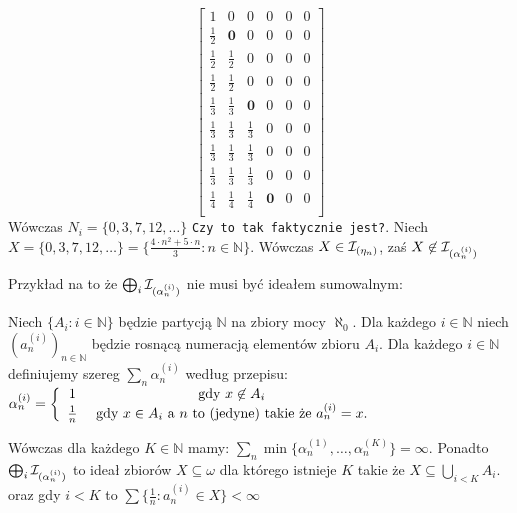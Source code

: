 \documentclass[12pt]{article}
\theoremstyle{plain}
\theoremstyle{definition}
\theoremstyle{remark}
\newcommand{\nnatural}{\mathbb{N}}
\newcommand{\cI}{{\cal I}}
\newcommand{\todo}[1]{{\tt #1}}
\begin{document}
\[
  \begin{bmatrix}
         1      &           0 & 0 & 0 & 0 & 0\\
    \frac{1}{2} &  \mathbf{0} & 0 & 0 & 0 & 0\\
    \frac{1}{2} & \frac{1}{2} & 0 & 0 & 0 & 0\\
    \frac{1}{2} & \frac{1}{2} & 0 & 0 & 0 & 0\\
    \frac{1}{3} & \frac{1}{3} & \mathbf{0} & 0 & 0 & 0\\
    \frac{1}{3} & \frac{1}{3} & \frac{1}{3} & 0 & 0 & 0\\
    \frac{1}{3} & \frac{1}{3} & \frac{1}{3} & 0 & 0 & 0\\
    \frac{1}{3} & \frac{1}{3} & \frac{1}{3} & 0 & 0 & 0\\
    \frac{1}{4} & \frac{1}{4} & \frac{1}{4} & \mathbf{0} & 0 & 0\\
  \end{bmatrix}
\]
Wówczas $N_i = \{0, 3, 7, 12, \ldots \}$ \todo{Czy to tak faktycznie jest?}.
Niech $X = \{0, 3, 7, 12, \ldots\} = \{ \frac{4 \cdot n^2 + 5 \cdot n}{3} \colon n \in\nnatural \}$.
Wówczas $X \in \cI_{(\eta_n)}$, zaś $X\not\in\cI_{(\alpha_n^{(i)})}$

Przykład na to że $\bigoplus_{i}\cI_{(\alpha_n^{(i)})}$ nie musi być
ideałem sumowalnym:
	
Niech $\{A_i\colon i\in\nnatural\}$ będzie partycją $\nnatural$
na zbiory mocy $\aleph_0$. Dla każdego $i\in\nnatural$ niech
$(a_n^{(i)})_{n\in\nnatural}$ będzie rosnącą numeracją
elementów zbioru $A_i$.
Dla każdego $i\in\nnatural$
definiujemy szereg $\sum_n \alpha_n^{(i)}$ według przepisu:
$\alpha_n^{(i)} = 
\left\{
\begin{array}{cc}
1 & \hbox{\ gdy\ } x \not\in A_i\\
\frac{1}{n} & \hbox{\ gdy\ } x \in A_i \hbox{{\ a\ }} n 
\hbox{{\ to\ (jedyne)\ takie\ że\ }} a_n^{(i)} = x.
\end{array}
\right.$

Wówczas dla każdego $K \in \nnatural$ mamy: 
$\sum_n \min \{\alpha_n^{(1)}, \ldots, \alpha_n^{(K)}\} = \infty$.
Ponadto 
$\bigoplus_{i}\cI_{(\alpha_n^{(i)})}$ to ideał zbiorów
$X \subseteq \omega$ dla którego istnieje $K$
takie że 
$X \subseteq \bigcup_{i < K} A_i$.
oraz gdy $i < K$ to 
$\sum \{\frac{1}{n} \colon a_n^{(i)} \in X\} < \infty$
\end{document}
